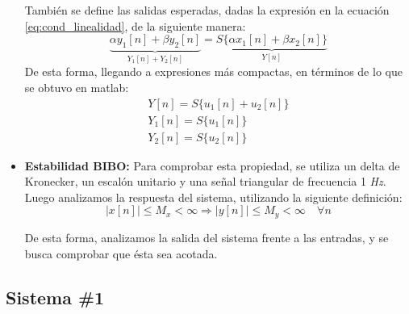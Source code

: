 \begin{itemize}
		También se define las salidas esperadas, dadas la expresión en la ecuación \ref{eq:cond_linealidad}, de la siguiente manera: 
		\begin{equation*}
			\underbrace{\alpha y_{1}[n] + \beta y_{2}[n]}_{Y_{1}[n] + Y_{2}[n]} = \underbrace{S \{ \alpha x_{1}[n] + \beta x_{2}[n] \}}_{Y[n]} 
		\end{equation*}
		De esta forma, llegando a expresiones más compactas, en términos de lo que se obtuvo en matlab:
		\begin{align}
			Y[n] = S \{ u_{1}[n] + u_{2}[n] \} \\
			Y_{1}[n] = S \{ u_{1}[n] \} \\
			Y_{2}[n] = S \{ u_{2}[n] \}
			\label{eq:lineality_outputs}
		\end{align}
		
		\item \textbf{Estabilidad BIBO:} Para comprobar esta propiedad, se utiliza un delta de Kronecker, un escalón unitario  y una señal triangular de frecuencia 1 \textit{Hz}. Luego analizamos la respuesta del sistema, utilizando la siguiente definición:
		\begin{equation}
			|x[n]| \leq M_{x} < \infty \Rightarrow |y[n]| \leq M_{y} < \infty \quad \forall n
			\label{eq:cond_bibo}
		\end{equation}
		
		De esta forma, analizamos la salida del sistema frente a las entradas, y se busca comprobar que ésta sea acotada.  
	\end{itemize}

\newpage

	\subsection{Sistema \#1}

